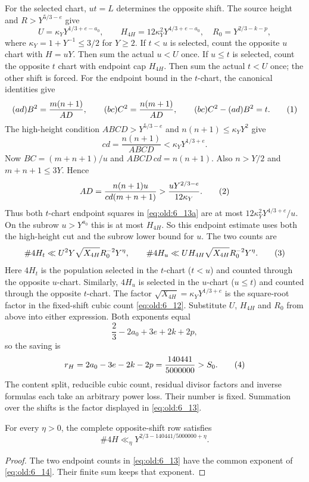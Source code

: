 For the selected chart, $ut=L$ determines the opposite shift.
The source height and $R>Y^{5/3-e}$ give
\[
U=\kappa_Y Y^{1/3+e-a_0},\qquad
H_{4H}=12\kappa_Y^2Y^{4/3+e-a_0},\quad R_0=Y^{2/3-k-p},
\]
where \(\kappa_Y=1+Y^{-1}\le3/2\) for \(Y\ge2\).  If \(t<u\) is selected,
count the opposite $u$ chart with $H=uY$.  Then sum the actual $u<U$ once.
If $u\le t$ is selected, count the opposite $t$ chart with endpoint cap
$H_{4H}$.  Then sum the actual $t<U$ once; the other shift is forced.  For
the endpoint bound in the $t$-chart, the canonical identities give
\[
 (ad)B^2=\frac{m(n+1)}{ AD},\qquad
 (bc)C^2=\frac{n(m+1)}{ AD},\qquad
 (bc)C^2-(ad)B^2=t.                                      \AutoTag{eq:old:6_13a}
\]
The high-height condition \(ABCD>Y^{5/3-e}\) and
\(n(n+1)\le\kappa_Y Y^2\) give
\[
 cd=\frac{n(n+1)}{ ABCD}<\kappa_Y Y^{1/3+e}.
\]
Now \(BC=(m+n+1)/u\) and \(ABCD\,cd=n(n+1)\).  Also
\(n>Y/2\) and \(m+n+1\le3Y\).  Hence
\[
 AD=\frac{n(n+1)u}{ cd(m+n+1)}
   >\frac{uY^{2/3-e}}{12\kappa_Y}.                            \AutoTag{eq:old:6_13b}
\]
Thus both \(t\)-chart endpoint squares in \eqref{eq:old:6_13a} are at most
\(12\kappa_Y^2Y^{4/3+e}/u\).  On the subrow \(u>Y^{a_0}\) this is at most
\(H_{4H}\).  So this endpoint estimate uses both the high-height cut and
the subrow lower bound for \(u\).  The two counts are
\[
 \#4H_t\ll U^2Y\sqrt{X_{4H}}R_0^{-2}Y^\eta,\qquad
 \#4H_u\ll U H_{4H}\sqrt{X_{4H}}R_0^{-2}Y^\eta.
\AutoTag{eq:old:6_13}
\]
Here \(4H_t\) is the population selected in the \(t\)-chart
(\(t<u\)) and counted through the opposite \(u\)-chart.  Similarly,
\(4H_u\) is selected in the \(u\)-chart (\(u\le t\)) and counted through
the opposite \(t\)-chart.  The factor
\(\sqrt{X_{4H}}=\kappa_Y Y^{1/3+e}\) is the square-root factor in the
fixed-shift cubic count \eqref{eq:old:6_12}.  Substitute \(U\),
\(H_{4H}\) and \(R_0\) from above into either expression.  Both exponents
equal
\[
 \frac{2}{3}-2a_0+3e+2k+2p,
\]
so the saving is
\[
 r_H=2a_0-3e-2k-2p=\frac{140441}{5000000}>S_0.             \AutoTag{eq:old:6_14}
\]
The content split, reducible cubic count, residual divisor factors and
inverse formulas each take an arbitrary power loss.  Their number is fixed.
Summation over the shifts is the factor displayed in \eqref{eq:old:6_13}.
\begin{rowproposition}\label{prop:row-4h}
For every \(\eta>0\), the complete opposite-shift row satisfies
\[
 \#4H\ll_\eta Y^{2/3-140441/5000000+\eta}.
\]
\end{rowproposition}
\begin{proof}
The two endpoint counts in \eqref{eq:old:6_13} have the common exponent of
\eqref{eq:old:6_14}.  Their finite sum keeps that exponent.
\end{proof}

